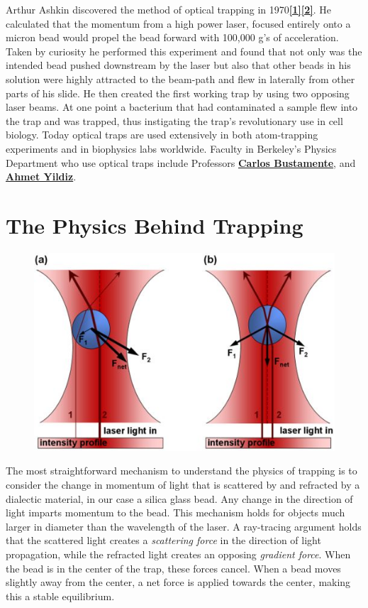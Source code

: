 \documentclass{../lab}
\begin{document}
Arthur Ashkin discovered the method of optical trapping in 1970\href{http://prl.aps.org/abstract/PRL/v24/i4/p156\_1}{\textbf{[1]}}\href{http://www.pnas.org/content/94/10/4853.full}{\textbf{[2]}}. He calculated that the momentum from a high power laser, focused entirely onto a micron bead would propel the bead forward with 100,000 g's of acceleration. Taken by curiosity he performed this experiment and found that not only was the intended bead pushed downstream by the laser but also that other beads in his solution were highly attracted to the beam-path and flew in laterally from other parts of his slide. He then created the first working trap by using two opposing laser beams. At one point a bacterium that had contaminated a sample flew into the trap and was trapped, thus instigating the trap's revolutionary use in cell biology. Today optical traps are used extensively in both atom-trapping experiments and in biophysics labs worldwide. Faculty in Berkeley's Physics Department who use optical traps include Professors \href{http://research.physics.berkeley.edu/bustamante/}{\textbf{Carlos Bustamente}}, and \href{http://research.physics.berkeley.edu/yildiz/}{\textbf{Ahmet Yildiz}}.

\section{The Physics Behind Trapping}


\begin{figure}[h]
    \centering
    \href{http://experimentationlab.berkeley.edu/sites/default/files/images/500px-Optical_Trap_Ray_Optics_Explanation.jpg}{\includegraphics[width=0.5\linewidth]{images/500px-Optical_Trap_Ray_Optics_Explanation.jpg}}
    \caption{}
    \label{fig:500px-Optical_Trap_Ray_Optics_Explanation}
\end{figure}

The most straightforward mechanism to understand the physics of trapping is to consider the change in momentum of light that is scattered by and refracted by a dialectic material, in our case a silica glass bead. Any change in the direction of light imparts momentum to the bead. This mechanism holds for objects much larger in diameter than the wavelength of the laser. A ray-tracing argument holds that the scattered light creates a \emph{scattering force} in the direction of light propagation, while the refracted light creates an opposing \emph{gradient force}. When the bead is in the center of the trap, these forces cancel. When a bead moves slightly away from the center, a net force is applied towards the center, making this a stable equilibrium.
\end{document}

